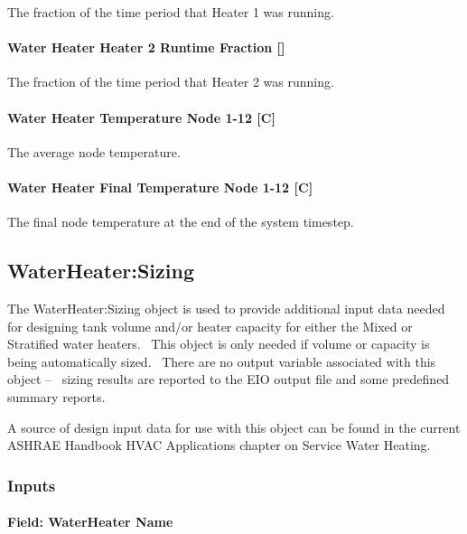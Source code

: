 The fraction of the time period that Heater 1 was running.

\paragraph{Water Heater Heater 2 Runtime Fraction {[]}}\label{water-heater-heater-2-runtime-fraction}

The fraction of the time period that Heater 2 was running.

\paragraph{Water Heater Temperature Node 1-12 {[}C{]}}\label{water-heater-temperature-node-1-12-c}

The average node temperature.

\paragraph{Water Heater Final Temperature Node 1-12 {[}C{]}}\label{water-heater-final-temperature-node-1-12-c}

The final node temperature at the end of the system timestep.

\subsection{WaterHeater:Sizing}\label{waterheatersizing}

The WaterHeater:Sizing object is used to provide additional input data needed for designing tank volume and/or heater capacity for either the Mixed or Stratified water heaters.~ This object is only needed if volume or capacity is being automatically sized.~ There are no output variable associated with this object --~ sizing results are reported to the EIO output file and some predefined summary reports.

A source of design input data for use with this object can be found in the current ASHRAE Handbook HVAC Applications chapter on Service Water Heating.

\subsubsection{Inputs}\label{inputs-2-045}

\paragraph{Field: WaterHeater Name}\label{field-waterheater-name}

